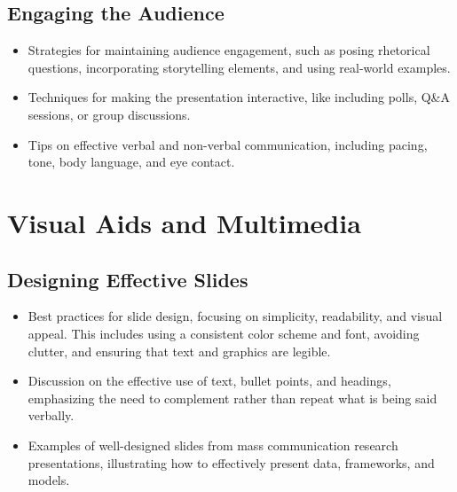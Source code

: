 \documentclass[
]{book}
\begin{document}
\hypertarget{engaging-the-audience}{%
\subsection*{Engaging the Audience}\label{engaging-the-audience}}

\begin{itemize}
\item
  Strategies for maintaining audience engagement, such as posing rhetorical questions, incorporating storytelling elements, and using real-world examples.
\item
  Techniques for making the presentation interactive, like including polls, Q\&A sessions, or group discussions.
\item
  Tips on effective verbal and non-verbal communication, including pacing, tone, body language, and eye contact.
\end{itemize}

\hypertarget{visual-aids-and-multimedia}{%
\section*{Visual Aids and Multimedia}\label{visual-aids-and-multimedia}}

\hypertarget{designing-effective-slides}{%
\subsection*{Designing Effective Slides}\label{designing-effective-slides}}

\begin{itemize}
\item
  Best practices for slide design, focusing on simplicity, readability, and visual appeal. This includes using a consistent color scheme and font, avoiding clutter, and ensuring that text and graphics are legible.
\item
  Discussion on the effective use of text, bullet points, and headings, emphasizing the need to complement rather than repeat what is being said verbally.
\item
  Examples of well-designed slides from mass communication research presentations, illustrating how to effectively present data, frameworks, and models.
\end{itemize}
\end{document}
